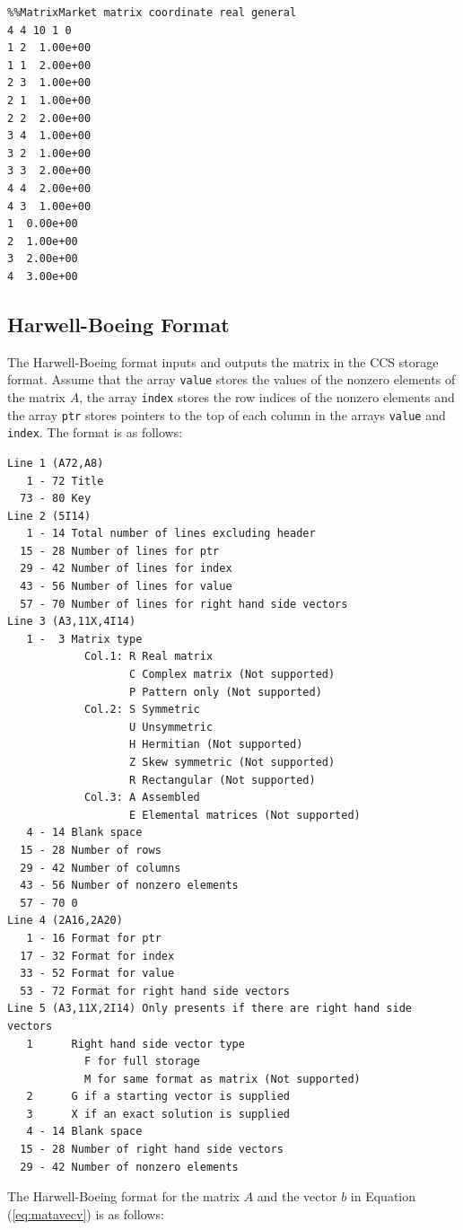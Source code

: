\documentclass[a4paper]{article}
\begin{document}
{\small
\begin{verbatim}
%%MatrixMarket matrix coordinate real general
4 4 10 1 0
1 2  1.00e+00
1 1  2.00e+00
2 3  1.00e+00
2 1  1.00e+00
2 2  2.00e+00
3 4  1.00e+00
3 2  1.00e+00
3 3  2.00e+00
4 4  2.00e+00
4 3  1.00e+00
1  0.00e+00
2  1.00e+00
3  2.00e+00
4  3.00e+00
\end{verbatim}
}

\subsection{Harwell-Boeing Format}
The Harwell-Boeing format inputs and outputs the matrix in the CCS storage format.
Assume that the array {\tt value} stores the values of the nonzero elements of the matrix $A$, 
the array {\tt index} stores the row indices of the nonzero elements and 
the array {\tt ptr} stores pointers to the top of each column in the
arrays {\tt value} and {\tt index}. The format is as follows: 

{\small
\begin{verbatim}
Line 1 (A72,A8)
   1 - 72 Title
  73 - 80 Key
Line 2 (5I14)
   1 - 14 Total number of lines excluding header 
  15 - 28 Number of lines for ptr
  29 - 42 Number of lines for index
  43 - 56 Number of lines for value
  57 - 70 Number of lines for right hand side vectors
Line 3 (A3,11X,4I14)
   1 -  3 Matrix type 
            Col.1: R Real matrix
                   C Complex matrix (Not supported)
                   P Pattern only (Not supported)
            Col.2: S Symmetric
                   U Unsymmetric
                   H Hermitian (Not supported)
                   Z Skew symmetric (Not supported)
                   R Rectangular (Not supported)
            Col.3: A Assembled
                   E Elemental matrices (Not supported)
   4 - 14 Blank space
  15 - 28 Number of rows
  29 - 42 Number of columns 
  43 - 56 Number of nonzero elements
  57 - 70 0
Line 4 (2A16,2A20)
   1 - 16 Format for ptr
  17 - 32 Format for index
  33 - 52 Format for value
  53 - 72 Format for right hand side vectors
Line 5 (A3,11X,2I14) Only presents if there are right hand side vectors
   1      Right hand side vector type
            F for full storage
            M for same format as matrix (Not supported)
   2      G if a starting vector is supplied
   3      X if an exact solution is supplied
   4 - 14 Blank space
  15 - 28 Number of right hand side vectors 
  29 - 42 Number of nonzero elements
\end{verbatim}
}

The Harwell-Boeing format for the matrix $A$ and the vector $b$ in Equation (\ref{eq:matavecv}) is as follows: 
\end{document}
